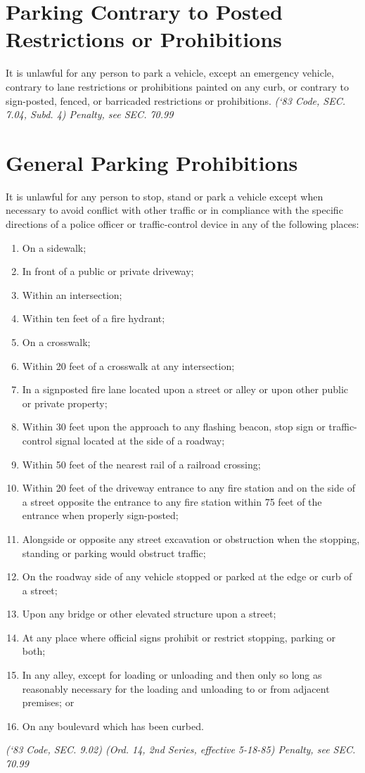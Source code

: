 \documentclass[code.tex]{subfiles}
\begin{document}
\section{Parking Contrary to Posted Restrictions or Prohibitions}
It is unlawful for any person to park a vehicle, except an emergency vehicle, contrary to lane restrictions or prohibitions painted on any curb, or contrary to sign-posted, fenced, or barricaded restrictions or prohibitions.\newline
\emph{(‘83 Code, SEC. 7.04, Subd. 4)  Penalty, see SEC. 70.99}

\section{General Parking Prohibitions}
It is unlawful for any person to stop, stand or park a vehicle except when necessary to avoid conflict with other traffic or in compliance with the specific directions of a police officer or traffic-control device in any of the following places:
\begin{enumerate}[{\indent}A)]
\item On a sidewalk;
\item In front of a public or private driveway;
\item Within an intersection;
\item Within ten feet of a fire hydrant;
\item On a crosswalk;
\item Within 20 feet of a crosswalk at any intersection;
\item In a signposted fire lane located upon a street or alley or upon other public or private property;
\item Within 30 feet upon the approach to any flashing beacon, stop sign or traffic-control signal located at the side of a roadway;
\item Within 50 feet of the nearest rail of a railroad crossing;
\item Within 20 feet of the driveway entrance to any fire station and on the side of a street opposite the entrance to any fire station within 75 feet of the entrance when properly sign-posted;
\item Alongside or opposite any street excavation or obstruction when the stopping, standing or parking would obstruct traffic;
\item On the roadway side of any vehicle stopped or parked at the edge or curb of a street;
\item Upon any bridge or other elevated structure upon a street;
\item At any place where official signs prohibit or restrict stopping, parking or both;
\item In any alley, except for loading or unloading and then only so long as reasonably necessary for the loading and unloading to or from adjacent premises; or
\item On any boulevard which has been curbed.
\end{enumerate}
\emph{(‘83 Code, SEC. 9.02)  (Ord. 14, 2nd Series, effective 5-18-85)  Penalty, see SEC. 70.99}
\end{document}
